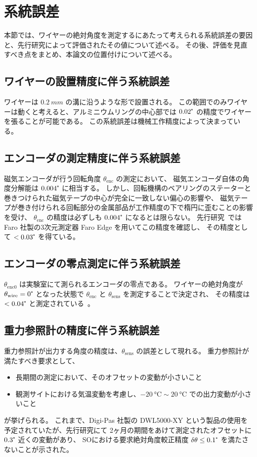 \documentclass[../../main.tex]{subfiles}
\begin{document}
\section{系統誤差}
本節では、ワイヤーの絶対角度を測定するにあたって考えられる系統誤差の要因と、先行研究によって評価されたその値について述べる。
その後、評価を見直すべき点をまとめ、本論文の位置付けについて述べる。
\subsection{ワイヤーの設置精度に伴う系統誤差}
ワイヤーは $\SI{0.2}{mm}$ の溝に沿うような形で設置される。
この範囲でのみワイヤーは動くと考えると、アルミニウムリングの中心部では $0.02\tcdegree$ の精度でワイヤーを張ることが可能である。
この系統誤差は機械工作精度によって決まっている。
\subsection{エンコーダの測定精度に伴う系統誤差}
磁気エンコーダが行う回転角度 $\theta_{\mathrm{enc}}$ の測定において、
磁気エンコーダ自体の角度分解能は $0.004\tcdegree$ に相当する。
しかし、回転機構のベアリングのステーターと巻きつけられた磁気テープの中心が完全に一致しない偏心の影響や、
磁気テープが巻き付けられる回転部分の金属部品が工作精度の下で楕円に歪むことの影響を受け、
$\theta_{\mathrm{enc}}$ の精度は必ずしも $0.004\tcdegree$ になるとは限らない。
先行研究~\cite{swg:iijima}では Faro 社製の3次元測定器 Faro Edge を用いてこの精度を確認し、
その精度として $< 0.03\tcdegree$ を得ている。
\subsection{エンコーダの零点測定に伴う系統誤差}
$\theta_{\mathrm{enc}0}$ は実験室にて測られるエンコーダの零点である。
ワイヤーの絶対角度が $\theta_{\mathrm{wire}} = 0\tcdegree$ となった状態で $\theta_{\mathrm{enc}}$ と $\theta_{\mathrm{sens}}$ を測定することで決定され、
その精度は $< 0.04\tcdegree$ と測定されている~\cite{swg:iijima}。\\

\subsection{重力参照計の精度に伴う系統誤差}
重力参照計が出力する角度の精度は、$\theta_{\mathrm{sens}}$ の誤差として現れる。
重力参照計が満たすべき要求として、
\begin{itemize}
    \item 長期間の測定において、そのオフセットの変動が小さいこと
    \item 観測サイトにおける気温変動を考慮し、$\SI{-20}{\degreeCelsius}\sim\SI{20}{\degreeCelsius}$ での出力変動が小さいこと
\end{itemize}
が挙げられる。
これまで、Digi-Pas 社製の DWL5000-XY という製品の使用を予定されていたが、先行研究\cite{swg:iijima}にて
2ヶ月の期間をあけて測定されたオフセットに $0.3\tcdegree$ 近くの変動があり、
SOにおける要求絶対角度較正精度 $\delta\theta \leq 0.1\tcdegree$ を満たさないことが示された。
\end{document}
